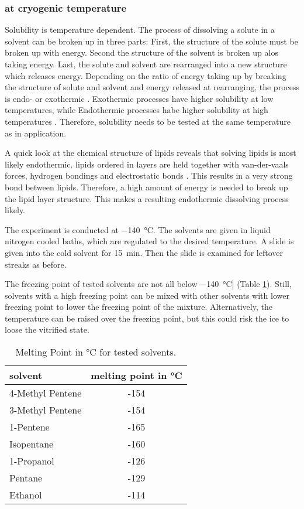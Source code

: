 \subsubsection{at cryogenic temperature}
\label{chapter:meltingtemp}

Solubility is temperature dependent. The process of dissolving a solute in a solvent can be broken up in three parts: First, the structure of the solute must be broken up with energy. Second the structure of the solvent is broken up alos taking energy. Last, the solute and solvent are rearranged into a new structure which releases energy. Depending on the ratio of energy taking up by breaking the structure of solute and solvent and energy released at rearranging, the process is endo- or exothermic \cite{ZafirJaveed.}. Exothermic processes have higher solubility at low temperatures, while Endothermic processes habe higher solubility at high temperatures \cite{Mortimer.2007}. Therefore, solubility needs to be tested at the same temperature as in application.

A quick look at the chemical structure of lipids reveals that solving lipids is most likely endothermic. lipids ordered in layers are held together with van-der-vaals forces, hydrogen bondings and electrostatic bonds \cite{RWayneAlbers.1999}. This results in a very strong bond between lipids. Therefore, a high amount of energy is needed to break up the lipid layer structure. This makes a resulting endothermic dissolving process likely.

The experiment is conducted at \SI{-140}{\degreeCelsius}. The solvents are given in liquid nitrogen cooled baths, which are regulated to the desired temperature. A slide is given into the cold solvent for \SI{15}{\minute}. Then the slide is examined for leftover streaks as before.

The freezing point of tested solvents are not all below \SI{-140}{\degreeCelsius}] (Table \ref{table:SchmelztemperaturLösungsmittel}). Still, solvents with a high freezing point can be mixed with other solvents with lower freezing point to lower the freezing point of the mixture. Alternatively, the temperature can be raised over the freezing point, but this could risk the ice to loose the vitrified state.

\begin{table}[hbt!]
	\centering
	\begin{tabular}{|l|c|}
		\hline
		solvent & melting point in °C \\
		\hline
		\hline
		4-Methyl Pentene & -154 \\ 
		\hline
		3-Methyl Pentene & -154 \\
		\hline
		1-Pentene & -165 \\
		\hline
		Isopentane & -160 \\
		\hline
		1-Propanol & -126 \\
		\hline
		Pentane & -129 \\
		\hline
		Ethanol & -114 \\
		\hline
	\end{tabular}
	\caption{Melting Point in °C for tested solvents.}
	\label{table:SchmelztemperaturLösungsmittel}
\end{table}

